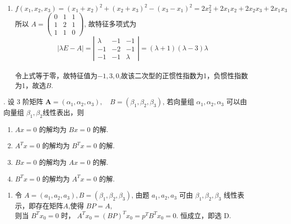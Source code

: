 \documentclass{article}
\begin{document}
\begin{enumerate}[\qquad 解：]
    \item $f\left(x_{1}, x_{2}, x_{3}\right)=\left(x_{1}+x_{2}\right)^{2}+\left(x_{2}+x_{3}\right)^{2}-\left(x_{3}-x_{1}\right)^{2}=2 x_{2}^{2}+2 x_{1} x_{2}+2 x_{2} x_{3}+2 x_{1} x_{3}$  \\
          所以 $A=\left(\begin{array}{lll}0 & 1 & 1  \\ 1 & 2 & 1  \\ 1 & 1 & 0\end{array}\right)$, 故特征多项式为
          $$
              |\lambda E-A|=\left|\begin{array}{rrr}
                  \lambda & -1 & -1      \\
                  -1      & -2 & -1      \\
                  -1      & -1 & \lambda
              \end{array}\right|=(\lambda+1)(\lambda-3) \lambda
          $$  \\
          令上式等于零，故特征值为$-1,3,0$,故该二次型的正惯性指数为1，负惯性指数为1，故选$B$.
\end{enumerate}

\vspace{1ex}
{.} 设 3 阶矩阵 $\boldsymbol{A}=\left(\alpha_{1}, \alpha_{2}, \alpha_{3}\right), \quad B=\left(\beta_{1}, \beta_{2}, \beta_{3}\right)$, 若向量组 $\alpha_{1}, \alpha_{2}, \alpha_{3}$ 可以由向量组 $\beta_{1}, \beta_{2}$线性表出，则
\begin{enumerate}
    \item $A x=0$ 的解均为 $B x=0$ 的解.
    \item $A^{T} x=0$ 的解均为 $B^{T} x=0$ 的解.
    \item $B x=0$ 的解均为 $A x=0$ 的解.
    \item $B^{T} x=0$ 的解均为 $A^{T} x=0$ 的解.
\end{enumerate}

\begin{enumerate}[\qquad 解：]
    \item 令 $A=\left(a_{1}, a_{2}, a_{3}\right), B=\left(\beta_{1}, \beta_{2}, \beta_{3}\right)$, 由题 $a_{1}, a_{2}, a_{3}$ 可由 $\beta_{1}, \beta_{2}, \beta_{3}$ 线性表示，即存在矩阵$A$,使得 $B P=A$, \\
          则当 $B^{T} x_{0}=0$ 时， $A^{T} x_{0}=(B P)^{T} x_{0}=p^{T} B^{T} x_{0}=0 .$ 恒成立，即选 $\mathrm{D}$.
\end{enumerate}
\end{document}
